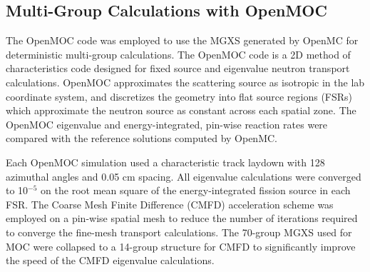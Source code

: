 \subsection{Multi-Group Calculations with OpenMOC}
\label{subsec:openmoc}

The OpenMOC code \citep{boyd2014openmoc} was employed to use the MGXS generated by OpenMC for deterministic multi-group calculations. The OpenMOC code is a 2D method of characteristics code designed for fixed source and eigenvalue neutron transport calculations. OpenMOC approximates the scattering source as isotropic in the lab coordinate system, and discretizes the geometry into flat source regions (FSRs) which approximate the neutron source as constant across each spatial zone. The OpenMOC eigenvalue and energy-integrated, pin-wise reaction rates were compared with the reference solutions computed by OpenMC.

Each OpenMOC simulation used a characteristic track laydown with 128 azimuthal angles and 0.05 cm spacing. All eigenvalue calculations were converged to 10$^{-5}$ on the root mean square of the energy-integrated fission source in each FSR. The Coarse Mesh Finite Difference (CMFD) acceleration scheme was employed on a pin-wise spatial mesh to reduce the number of iterations required to converge the fine-mesh transport calculations. The 70-group MGXS used for MOC were collapsed to a 14-group structure for CMFD to significantly improve the speed of the CMFD eigenvalue calculations.
